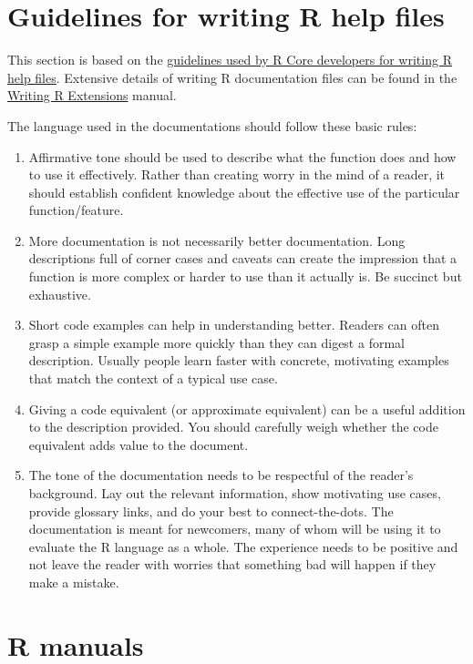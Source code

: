\documentclass[
]{book}
\begin{document}
\section{Guidelines for writing R help files}\label{guidelines-for-writing-r-help-files}

This section is based on the \href{https://developer.r-project.org/Rds.html}{guidelines used by R Core developers for writing R help files}. Extensive details of writing R documentation files can be found in the \href{https://cran.r-project.org/doc/manuals/r-release/R-exts.html\#Writing-R-documentation-files}{Writing R Extensions} manual.

The language used in the documentations should follow these basic rules:

\begin{enumerate}
\def\labelenumi{\arabic{enumi}.}
\item
  Affirmative tone should be used to describe what the function does and how to use it effectively. Rather than creating worry in the mind of a reader, it should establish confident knowledge about the effective use of the particular function/feature.
\item
  More documentation is not necessarily better documentation. Long descriptions full of corner cases and caveats can create the impression that a function is more complex or harder to use than it actually is. Be succinct but exhaustive.
\item
  Short code examples can help in understanding better. Readers can often grasp a simple example more quickly than they can digest a formal description. Usually people learn faster with concrete, motivating examples that match the context of a typical use case.
\item
  Giving a code equivalent (or approximate equivalent) can be a useful addition to the description provided. You should carefully weigh whether the code equivalent adds value to the document.
\item
  The tone of the documentation needs to be respectful of the reader's background. Lay out the relevant information, show motivating use cases, provide glossary links, and do your best to connect-the-dots. The documentation is meant for newcomers, many of whom will be using it to evaluate the R language as a whole. The experience needs to be positive and not leave the reader with worries that something bad will happen if they make a mistake.
\end{enumerate}

\section{R manuals}\label{r-manuals}
\end{document}

